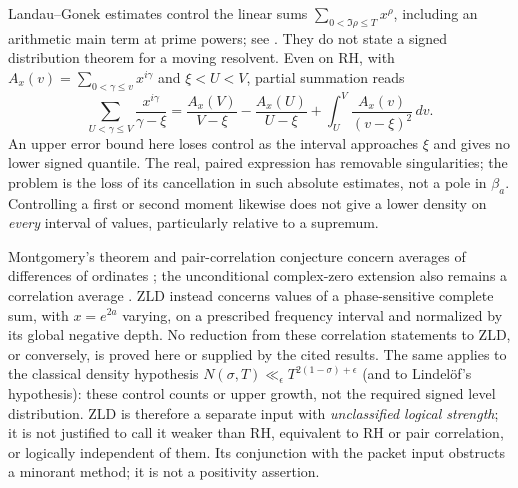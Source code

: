 \documentclass[11pt]{article}
\theoremstyle{remark}
\begin{document}
Landau--Gonek estimates control the linear sums
$\sum_{0<\Im\rho\le T}x^\rho$, including an arithmetic main term
at prime powers; see \cite[Introduction, (1.1)]{Aryan2019}.
They do not state a signed distribution theorem for a moving resolvent.
Even on RH, with $A_x(v)=\sum_{0<\gamma\le v}x^{i\gamma}$ and
$\xi<U<V$, partial summation reads
\[
 \sum_{U<\gamma\le V}\frac{x^{i\gamma}}{\gamma-\xi}
 =\frac{A_x(V)}{V-\xi}-\frac{A_x(U)}{U-\xi}
       +\int_U^V\frac{A_x(v)}{(v-\xi)^2}\,dv.
\]
An upper error bound here loses control as the interval approaches
$\xi$ and gives no lower signed quantile. The real, paired expression
has removable singularities; the problem is the loss of its cancellation
in such absolute estimates, not a pole in $\beta_a$. Controlling a
first or second moment likewise does not give a lower density on
\emph{every} interval of values, particularly relative to a supremum.

Montgomery's theorem and pair-correlation conjecture concern averages
of differences of ordinates \cite{Montgomery1973}; the unconditional
complex-zero extension also remains a correlation average
\cite[Theorem 1]{BaluyotEtAl2023}. ZLD instead concerns values of a
phase-sensitive complete sum, with $x=e^{2a}$ varying, on a prescribed
frequency interval and normalized by its global negative depth. No
reduction from these correlation statements to ZLD, or conversely, is
proved here or supplied by the cited results. The same applies to the
classical density hypothesis
$N(\sigma,T)\ll_\epsilon T^{2(1-\sigma)+\epsilon}$ (and to
Lindel\"of's hypothesis): these control counts or upper growth, not the
required signed level distribution. ZLD is therefore a separate input
with \emph{unclassified logical strength}; it is not justified to call
it weaker than RH, equivalent to RH or pair correlation, or logically
independent of them. Its conjunction with the packet input obstructs
a minorant method; it is not a positivity assertion.
\end{document}
